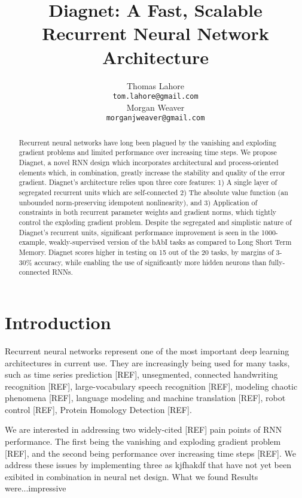 \documentclass{article}
\title{Diagnet: A Fast, Scalable Recurrent Neural Network Architecture}
\author{
Thomas Lahore\\
\texttt{tom.lahore@gmail.com}\\
\And
Morgan Weaver\\
\texttt{morganjweaver@gmail.com}
}
\begin{document}
\maketitle
\begin{abstract}

  Recurrent neural networks have long been plagued by the vanishing and exploding gradient problems and limited performance over increasing time steps. We propose Diagnet, a novel RNN design which incorporates architectural and process-oriented elements which, in combination, greatly increase the stability and quality of the error gradient. Diagnet’s architecture relies upon three core features: 1) A single layer of segregated recurrent units which are self-connected 2) The absolute value function (an unbounded norm-preserving idempotent nonlinearity), and 3) Application of constraints in both recurrent parameter weights and gradient norms, which tightly control the exploding gradient problem.  Despite the segregated and simplistic nature of Diagnet's recurrent units, significant performance improvement is seen in the 1000-example, weakly-supervised version of the bAbI tasks as compared to Long Short Term Memory. Diagnet scores higher in testing on 15 out of the 20 tasks, by margins of 3-30\% accuracy, while enabling the use of significantly more hidden neurons than fully-connected RNNs. 

\end{abstract}

\section{Introduction}

Recurrent neural networks represent one of the most important deep learning architectures in current use.  They are increasingly being used for many tasks, such as time series prediction [REF], unsegmented, connected handwriting recognition [REF], large-vocabulary speech recognition [REF], modeling chaotic phenomena [REF], language modeling and machine translation [REF], robot control [REF], Protein Homology Detection [REF].
      
We are interested in addressing two widely-cited [REF] pain points of RNN performance.  The first being the vanishing and exploding gradient problem [REF], and the second being performance over increasing time steps [REF].  We address these issues by implementing three as kjfhakdf that have not yet been exibited in combination in neural net design. 
What we found Results were...impressive
\end{document}

